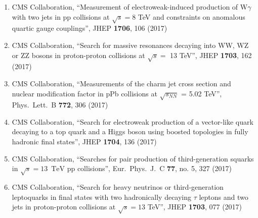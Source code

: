 \begin{enumerate}
\item CMS Collaboration, ``Measurement of electroweak-induced production of W$\gamma$ with two jets in pp collisions at $ \sqrt{s}=8 $ TeV and constraints on anomalous quartic gauge couplings'', JHEP {\bf 1706}, 106 (2017)

\item CMS Collaboration, ``Search for massive resonances decaying into WW, WZ or ZZ bosons in proton-proton collisions at $\sqrt{s} = $ 13 TeV'', JHEP {\bf 1703}, 162 (2017)

\item CMS Collaboration, ``Measurements of the charm jet cross section and nuclear modification factor in pPb collisions at $\sqrt{{s}_{NN}}$ = 5.02 TeV'', Phys.\ Lett.\ B {\bf 772}, 306 (2017)

\item CMS Collaboration, ``Search for electroweak production of a vector-like quark decaying to a top quark and a Higgs boson using boosted topologies in fully hadronic final states'', JHEP {\bf 1704}, 136 (2017)

\item CMS Collaboration, ``Searches for pair production of third-generation squarks in $\sqrt{s}=13$ $\,\text {TeV}$ pp collisions'', Eur.\ Phys.\ J.\ C {\bf 77}, no. 5, 327 (2017)

\item CMS Collaboration, ``Search for heavy neutrinos or third-generation leptoquarks in final states with two hadronically decaying $\tau$ leptons and two jets in proton-proton collisions at $ \sqrt{s}=13 $ TeV'', JHEP {\bf 1703}, 077 (2017)


\end{enumerate}
